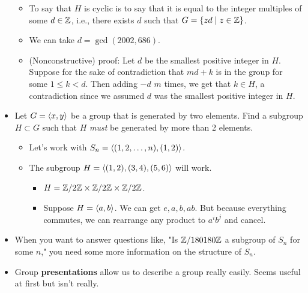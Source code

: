 \documentclass[../notes.tex]{subfiles}
\begin{document}
\begin{itemize}
\begin{itemize}
        \item To say that $H$ is cyclic is to say that it is equal to the integer multiples of some $d\in\mathbb{Z}$, i.e., there exists $d$ such that $G=\{zd\mid z\in\mathbb{Z}\}$.
        \item We can take $d=\gcd(2002,686)$.
        \item (Nonconstructive) proof: Let $d$ be the smallest positive integer in $H$. Suppose for the sake of contradiction that $md+k$ is in the group for some $1\leq k<d$. Then adding $-d$ $m$ times, we get that $k\in H$, a contradiction since we assumed $d$ was the smallest positive integer in $H$.
    \end{itemize}
    \item Let $G=\left\langle{x,y}\right\rangle$ be a group that is generated by two elements. Find a subgroup $H\subset G$ such that $H$ \emph{must} be generated by more than 2 elements.
    \begin{itemize}
        \item Let's work with $S_n=\left\langle{(1,2,\dots,n),(1,2)}\right\rangle$.
        \item The subgroup $H=\left\langle{(1,2),(3,4),(5,6)}\right\rangle$ will work.
        \begin{itemize}
            \item $H=\mathbb{Z}/2\mathbb{Z}\times\mathbb{Z}/2\mathbb{Z}\times\mathbb{Z}/2\mathbb{Z}$.
            \item Suppose $H=\left\langle{a,b}\right\rangle$. We can get $e,a,b,ab$. But because everything commutes, we can rearrange any product to $a^ib^j$ and cancel.
        \end{itemize}
    \end{itemize}
    \item When you want to answer questions like, "Is $\mathbb{Z}/180180\mathbb{Z}$ a subgroup of $S_n$ for some $n$," you need some more information on the structure of $S_n$.
    \item Group \textbf{presentations} allow us to describe a group really easily. Seems useful at first but isn't really.
\end{itemize}
\end{document}
